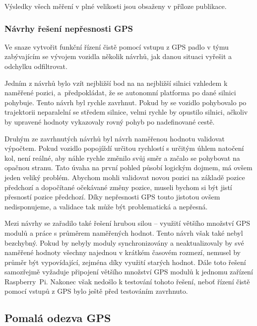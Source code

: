\documentclass[czech, bachelor]{diploma}
\begin{document}
Výsledky všech měření v plné velikosti jsou obsaženy v příloze publikace.

\subsubsection{Návrhy řešení nepřesnosti GPS}

Ve snaze vytvořit funkční řízení čistě pomocí vstupu z GPS padlo v týmu zabývajícím se vývojem vozidla několik návrhů, jak danou
situaci vyřešit a odchylku odfiltrovat.

Jedním z návrhů bylo vzít nejbližší bod na na nejbližší silnici vzhledem k naměřené pozici, a~předpokládat, že se autonomní
platforma po dané silnici pohybuje. Tento návrh byl rychle zavrhnut. Pokud by se vozidlo pohybovalo po trajektorii neparalelní
se středem silnice, velmi rychle by opustilo silnici, ačkoliv by upravené hodnoty vykazovaly rovný pohyb po nadefinované cestě.

Druhým ze zavrhnutých návrhů byl návrh naměřenou hodnotu validovat výpočtem. Pokud vozidlo popojíždí určitou rychlostí s určitým
úhlem natočení kol, není reálné, aby náhle rychle změnilo svůj směr a začalo se pohybovat na opačnou stranu. Tato úvaha na první
pohled působí logickým dojmem, má ovšem jeden veliký problém. Abychom mohli validovat novou pozici na základě pozice předchozí
a dopočítané očekávané změny pozice, museli bychom si být jistí přesností pozice předchozí. Díky nepřesnosti GPS touto jistotou
ovšem nedisponujeme, a validace tak může být problematická a nepřesná.

Mezi návrhy se zařadilo také řešení hrubou silou -- využití většího množství GPS modulů a práce s průměrem naměřených hodnot.
Tento návrh však také nebyl bezchybný. Pokud by nebyly moduly synchronizovány a neaktualizovaly by své naměřené hodnoty všechny
najednou v krátkém časovém rozmezí, nemusel by průměr být vypovídající, zejména díky využití starých hodnot. Dále toto řešení
samozřejmě vyžaduje připojení většího množství GPS modulů k jednomu zařízení Raspberry~Pi. Nakonec však nedošlo k testování tohoto
řešení, neboť řízení čistě pomocí vstupů z GPS bylo ještě před testováním zavrhnuto.

\subsection{Pomalá odezva GPS} \label{gps-low-polling-rate}
\end{document}
